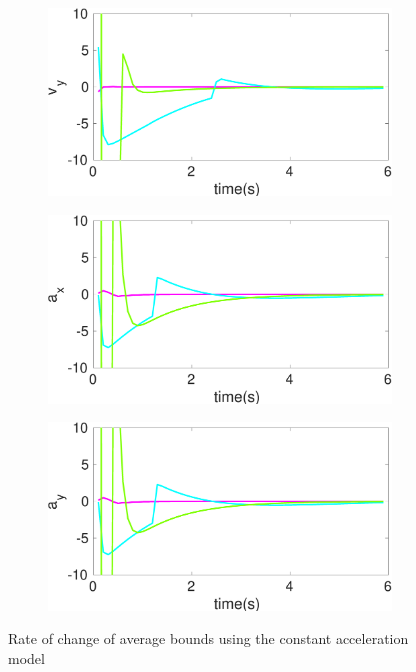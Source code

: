 \begin{figure}[!h]
\begin{subfigure}{.5\linewidth}
\end{subfigure}
\begin{subfigure}{.5\linewidth}
\centering
\includegraphics[width=\linewidth]{figures/BoundChange/CA/ca_bound_changev_y}
\end{subfigure}
\begin{subfigure}{.5\linewidth}
\centering
\includegraphics[width=\linewidth]{figures/BoundChange/CA/ca_bound_changea_x}
\end{subfigure}
\begin{subfigure}{.5\linewidth}
\centering
\includegraphics[width=\linewidth]{figures/BoundChange/CA/ca_bound_changea_y}
\end{subfigure}
\caption{Rate of change of average bounds using the constant acceleration model}
\end{figure}

